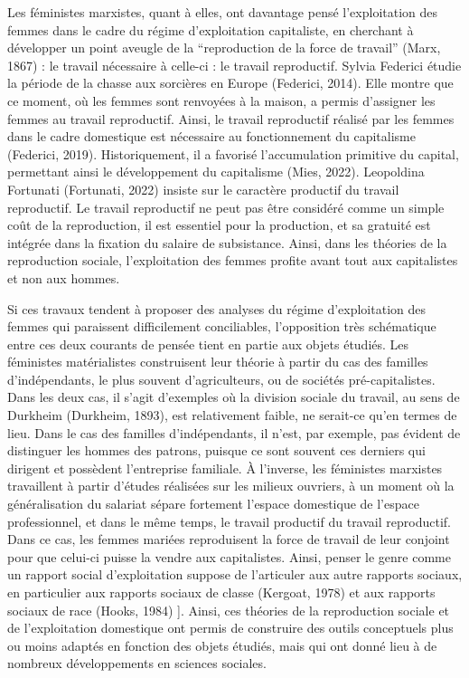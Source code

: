 \documentclass[
  12pt,
]{book}
\begin{document}
Les féministes marxistes, quant à elles, ont davantage pensé
l'exploitation des femmes dans le cadre du régime d'exploitation
capitaliste, en cherchant à développer un point aveugle de la
``reproduction de la force de travail'' (Marx, 1867) : le travail
nécessaire à celle-ci : le travail reproductif. Sylvia Federici étudie
la période de la chasse aux sorcières en Europe (Federici, 2014). Elle
montre que ce moment, où les femmes sont renvoyées à la maison, a permis
d'assigner les femmes au travail reproductif. Ainsi, le travail
reproductif réalisé par les femmes dans le cadre domestique est
nécessaire au fonctionnement du capitalisme (Federici, 2019).
Historiquement, il a favorisé l'accumulation primitive du capital,
permettant ainsi le développement du capitalisme (Mies, 2022).
Leopoldina Fortunati (Fortunati, 2022) insiste sur le caractère
productif du travail reproductif. Le travail reproductif ne peut pas
être considéré comme un simple coût de la reproduction, il est essentiel
pour la production, et sa gratuité est intégrée dans la fixation du
salaire de subsistance. Ainsi, dans les théories de la reproduction
sociale, l'exploitation des femmes profite avant tout aux capitalistes
et non aux hommes.

Si ces travaux tendent à proposer des analyses du régime d'exploitation
des femmes qui paraissent difficilement conciliables, l'opposition très
schématique entre ces deux courants de pensée tient en partie aux objets
étudiés. Les féministes matérialistes construisent leur théorie à partir
du cas des familles d'indépendants, le plus souvent d'agriculteurs, ou
de sociétés pré-capitalistes. Dans les deux cas, il s'agit d'exemples où
la division sociale du travail, au sens de Durkheim (Durkheim, 1893),
est relativement faible, ne serait-ce qu'en termes de lieu. Dans le cas
des familles d'indépendants, il n'est, par exemple, pas évident de
distinguer les hommes des patrons, puisque ce sont souvent ces derniers
qui dirigent et possèdent l'entreprise familiale. À l'inverse, les
féministes marxistes travaillent à partir d'études réalisées sur les
milieux ouvriers, à un moment où la généralisation du salariat sépare
fortement l'espace domestique de l'espace professionnel, et dans le même
temps, le travail productif du travail reproductif. Dans ce cas, les
femmes mariées reproduisent la force de travail de leur conjoint pour
que celui-ci puisse la vendre aux capitalistes. Ainsi, penser le genre
comme un rapport social d'exploitation suppose de l'articuler aux autre
rapports sociaux, en particulier aux rapports sociaux de classe
(Kergoat, 1978) et aux rapports sociaux de race (Hooks, 1984) {]}.
Ainsi, ces théories de la reproduction sociale et de l'exploitation
domestique ont permis de construire des outils conceptuels plus ou moins
adaptés en fonction des objets étudiés, mais qui ont donné lieu à de
nombreux développements en sciences sociales.
\end{document}
